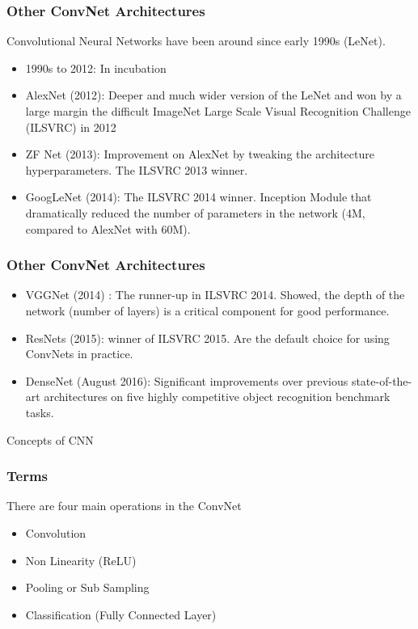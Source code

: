 \begin{frame}[fragile] \frametitle{Other ConvNet Architectures}
Convolutional Neural Networks have been around since early 1990s (LeNet).
\begin{itemize}
\item 1990s to 2012: In incubation
\item AlexNet (2012): Deeper and much wider version of the LeNet and won by a large margin the difficult ImageNet Large Scale Visual Recognition Challenge (ILSVRC) in 2012
\item ZF Net (2013): Improvement on AlexNet by tweaking the architecture hyperparameters. The ILSVRC 2013 winner.
\item GoogLeNet (2014): The ILSVRC 2014 winner. Inception Module that dramatically reduced the number of parameters in the network (4M, compared to AlexNet with 60M).
\end{itemize}
\end{frame}

\begin{frame}[fragile] \frametitle{Other ConvNet Architectures}
\begin{itemize}
\item VGGNet (2014) : The runner-up in ILSVRC 2014. Showed, the depth of the network (number of layers) is a critical component for good performance.
\item ResNets (2015): winner of ILSVRC 2015. Are the default choice for using ConvNets in practice.
\item DenseNet (August 2016): Significant improvements over previous state-of-the-art architectures on five highly competitive object recognition benchmark tasks.
\end{itemize}
\end{frame}


\begin{frame}
  \begin{center}
    {\Large Concepts of CNN }
  \end{center}
\end{frame}

\begin{frame}[fragile] \frametitle{Terms}
There are four main operations in the ConvNet 

\begin{itemize}
\item Convolution
\item Non Linearity (ReLU)
\item Pooling or Sub Sampling
\item Classification (Fully Connected Layer)
\end{itemize}
\end{frame}



